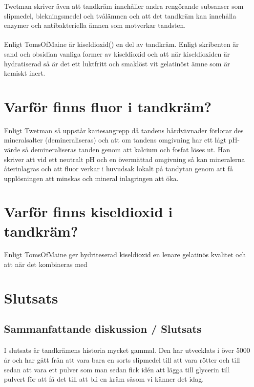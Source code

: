 \documentclass[12pt]{article}
\begin{document}
		Twetman skriver även att tandkräm innehåller andra rengörande subsanser som slipmedel, blekningsmedel och tvålämnen och att det tandkräm kan innehålla enzymer och antibakteriella ämnen som motverkar tandsten.
	
		\paragraph{}Enligt TomsOfMaine är kiseldioxid() en del av tandkräm. Enligt skribenten är sand och obsidian vanliga former av kiseldioxid och att när kiseldioxiden är hydratiserad så är det ett luktfritt och smaklöst vit gelatinöst ämne som är kemiskt inert. 

	
	\section{Varför finns fluor i tandkräm?}
		\paragraph{}Enligt Twetman så uppstår kariesangrepp då tandens hårdvävnader förlorar des mineralsalter (demineraliseras) och att om tandens omgivning har ett lågt pH-värde så demineraliseras tanden genom att kalcium och fosfat löses ut. Han skriver att vid ett neutralt pH och en övermättad omgivning så kan mineralerna återinlagras och att fluor verkar i huvudsak lokalt på tandytan genom att få upplösningen att minskas och mineral inlagringen att öka. 

	\section{Varför finns kiseldioxid i tandkräm?}
		\paragraph{}Enligt TomsOfMaine ger hydriteserad kiseldioxid en lenare gelatinös kvalitet och att när det kombineras med 

	\section{Slutsats}
		\subsection{Sammanfattande diskussion / Slutsats}
			\paragraph{}I slutsats är tandkrämens historia mycket gammal. Den har utvecklats i över 5000 år och har gått från att vara bara en sorts slipmedel till att vara rötter och till sedan att vara ett pulver som man sedan fick idén att lägga till glycerin till pulvert för att få det till att bli en kräm såsom vi känner det idag. 
\end{document}
